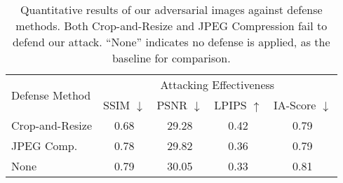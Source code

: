 
\begin{table}[t]
\footnotesize{
    \centering
    \begin{tabular}{lcccc}
        \toprule
        \multirow{2}{*}{Defense Method} & \multicolumn{4}{c}{Attacking Effectiveness} \\ 
         &  SSIM $\downarrow$ & PSNR $\downarrow$ & LPIPS $\uparrow$ & IA-Score $\downarrow$ \\
        \midrule
        Crop-and-Resize & 0.68 & 29.28 & 0.42 & 0.79 \\
        JPEG Comp. & 0.78  & 29.82 & 0.36 & 0.79 \\
        \midrule
        None & 0.79 & 30.05 & 0.33 & 0.81 \\
        \bottomrule
    \end{tabular}
    \caption{Quantitative results of our adversarial images against defense methods. Both Crop-and-Resize and JPEG Compression fail to defend our attack. ``None'' indicates no defense is applied, as the baseline for comparison.}
\label{tab:defense}
}
\end{table}
